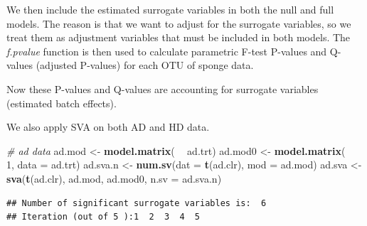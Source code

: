\documentclass[]{book}
\newenvironment{Shaded}{\begin{snugshade}}{\end{snugshade}}
\newcommand{\KeywordTok}[1]{\textcolor[rgb]{0.13,0.29,0.53}{\textbf{#1}}}
\newcommand{\DataTypeTok}[1]{\textcolor[rgb]{0.13,0.29,0.53}{#1}}
\newcommand{\DecValTok}[1]{\textcolor[rgb]{0.00,0.00,0.81}{#1}}
\newcommand{\StringTok}[1]{\textcolor[rgb]{0.31,0.60,0.02}{#1}}
\newcommand{\CommentTok}[1]{\textcolor[rgb]{0.56,0.35,0.01}{\textit{#1}}}
\newcommand{\OperatorTok}[1]{\textcolor[rgb]{0.81,0.36,0.00}{\textbf{#1}}}
\newcommand{\NormalTok}[1]{#1}
\begin{document}
We then include the estimated surrogate variables in both the null and
full models. The reason is that we want to adjust for the surrogate
variables, so we treat them as adjustment variables that must be
included in both models. The \emph{f.pvalue} function is then used to
calculate parametric F-test P-values and Q-values (adjusted P-values)
for each OTU of sponge data.

\begin{Shaded}
\end{Shaded}

Now these P-values and Q-values are accounting for surrogate variables
(estimated batch effects).

We also apply SVA on both AD and HD data.

\begin{Shaded}
\begin{Highlighting}[]
\CommentTok{# ad data}
\NormalTok{ad.mod <-}\StringTok{ }\KeywordTok{model.matrix}\NormalTok{( }\OperatorTok{~}\StringTok{ }\NormalTok{ad.trt)}
\NormalTok{ad.mod0 <-}\StringTok{ }\KeywordTok{model.matrix}\NormalTok{( }\OperatorTok{~}\StringTok{ }\DecValTok{1}\NormalTok{, }\DataTypeTok{data =}\NormalTok{ ad.trt)}
\NormalTok{ad.sva.n <-}\StringTok{ }\KeywordTok{num.sv}\NormalTok{(}\DataTypeTok{dat =} \KeywordTok{t}\NormalTok{(ad.clr), }\DataTypeTok{mod =}\NormalTok{ ad.mod)}
\NormalTok{ad.sva <-}\StringTok{ }\KeywordTok{sva}\NormalTok{(}\KeywordTok{t}\NormalTok{(ad.clr), ad.mod, ad.mod0, }\DataTypeTok{n.sv =}\NormalTok{ ad.sva.n)}
\end{Highlighting}
\end{Shaded}

\begin{verbatim}
## Number of significant surrogate variables is:  6 
## Iteration (out of 5 ):1  2  3  4  5
\end{verbatim}
\end{document}
